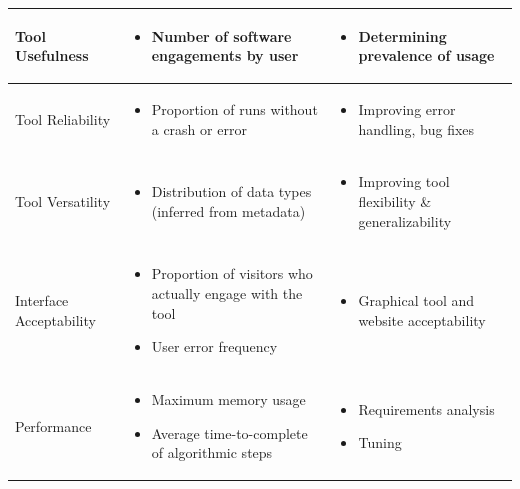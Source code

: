 \documentclass{article}
\begin{document}
\begin{table}[!ht]
\begin{tabular}{|p{}|p{}|p{}|}
    \hline
    Tool Usefulness & 
    \begin{itemize}
         \item Number of software engagements by user
    \end{itemize}  &
    \begin{itemize}
         \item Determining prevalence of usage
    \end{itemize} \\
    \hline
    Tool Reliability & 
    \begin{itemize}
         \item Proportion of runs without a crash or error
    \end{itemize}  &
    \begin{itemize}
        \item Improving error handling, bug fixes 
    \end{itemize} \\
    \hline
    Tool Versatility &
        \begin{itemize}
        \item Distribution of data types (inferred from metadata) 
        \end{itemize} &
        \begin{itemize}
        \item Improving tool flexibility \& generalizability
        \end{itemize}\\
    \hline
    Interface Acceptability &
    \begin{itemize}
        \item Proportion of visitors who actually engage with the tool
        \item User error frequency
    \end{itemize} &
    \begin{itemize}
        \item Graphical tool and website acceptability
        \end{itemize}\\
    \hline
    Performance &
    \begin{itemize}
        \item Maximum memory usage
        \item Average time-to-complete of algorithmic steps 
    \end{itemize} &
    \begin{itemize}
        \item{Requirements analysis}
        \item{Tuning}
    \end{itemize}\\
    \hline
  \end{tabular}
  \label{tab:metrics_table}
\end{table}
\end{document}
